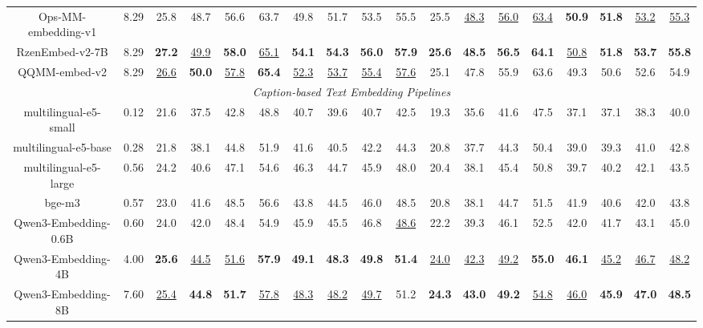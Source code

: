 \begin{table}[t]
{\begin{tabular}{cc|cccccccc|cccccccc}
Ops-MM-embedding-v1           & 8.29 & 25.8 & 48.7 & 56.6 & 63.7 & 49.8 & 51.7 & 53.5 & 55.5 & 25.5 & \underline{48.3} & \underline{56.0} & \underline{63.4} & \textbf{50.9} & \textbf{51.8} & \underline{53.2} & \underline{55.3} \\
RzenEmbed-v2-7B               & 8.29 & \textbf{27.2} & \underline{49.9} & \textbf{58.0} & \underline{65.1} & \textbf{54.1} & \textbf{54.3} & \textbf{56.0} & \textbf{57.9} & \textbf{25.6} & \textbf{48.5} & \textbf{56.5} & \textbf{64.1} & \underline{50.8} & \textbf{51.8} & \textbf{53.7} & \textbf{55.8} \\
QQMM-embed-v2                 & 8.29 & \underline{26.6} & \textbf{50.0} & \underline{57.8} & \textbf{65.4} & \underline{52.3} & \underline{53.7} & \underline{55.4} & \underline{57.6} & 25.1 & 47.8 & 55.9 & 63.6 & 49.3 & 50.6 & 52.6 & 54.9 \\ \hline
\multicolumn{18}{c}{\cellcolor[HTML]{EFEFEF}\textit{Caption-based Text Embedding Pipelines}}           \\
multilingual-e5-small         & 0.12 & 21.6 & 37.5 & 42.8 & 48.8 & 40.7 & 39.6 & 40.7 & 42.5 & 19.3 & 35.6 & 41.6 & 47.5 & 37.1 & 37.1 & 38.3 & 40.0 \\
multilingual-e5-base          & 0.28 & 21.8 & 38.1 & 44.8 & 51.9 & 41.6 & 40.5 & 42.2 & 44.3 & 20.8 & 37.7 & 44.3 & 50.4 & 39.0 & 39.3 & 41.0 & 42.8 \\
multilingual-e5-large         & 0.56 & 24.2 & 40.6 & 47.1 & 54.6 & 46.3 & 44.7 & 45.9 & 48.0 & 20.4 & 38.1 & 45.4 & 50.8 & 39.7 & 40.2 & 42.1 & 43.5 \\
bge-m3                        & 0.57 & 23.0 & 41.6 & 48.5 & 56.6 & 43.8 & 44.5 & 46.0 & 48.5 & 20.8 & 38.1 & 44.7 & 51.5 & 41.9 & 40.6 & 42.0 & 43.8 \\
Qwen3-Embedding-0.6B          & 0.60 & 24.0 & 42.0 & 48.4 & 54.9 & 45.9 & 45.5 & 46.8 & \underline{48.6} & 22.2 & 39.3 & 46.1 & 52.5 & 42.0 & 41.7 & 43.1 & 45.0 \\
Qwen3-Embedding-4B            & 4.00 & \textbf{25.6} & \underline{44.5} & \underline{51.6} & \textbf{57.9} & \textbf{49.1} & \textbf{48.3} & \textbf{49.8} & \textbf{51.4} & \underline{24.0} & \underline{42.3} & \underline{49.2} & \textbf{55.0} & \textbf{46.1} & \underline{45.2} & \underline{46.7} & \underline{48.2} \\
Qwen3-Embedding-8B            & 7.60 & \underline{25.4} & \textbf{44.8} & \textbf{51.7} & \underline{57.8} & \underline{48.3} & \underline{48.2} & \underline{49.7} & 51.2 & \textbf{24.3} & \textbf{43.0} & \textbf{49.2} & \underline{54.8} & \underline{46.0} & \textbf{45.9} & \textbf{47.0} & \textbf{48.5} \\ \hline

\end{tabular}}
\end{table}
